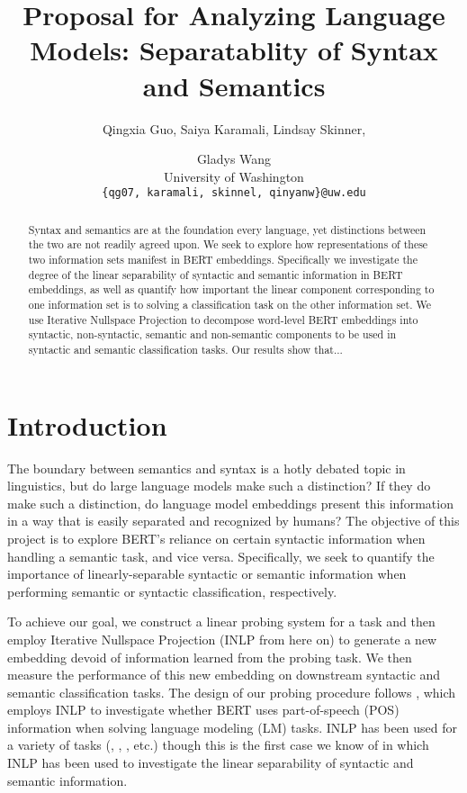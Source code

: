 \documentclass[11pt,a4paper]{article}
\title{Proposal for Analyzing Language Models: Separatablity of Syntax and Semantics}
\author{Qingxia Guo, Saiya Karamali, Lindsay Skinner, \and Gladys Wang
 \\ University of Washington \\ 
\texttt{\{qg07, karamali, skinnel, qinyanw\}@uw.edu}\\ 
}
\date{}
\begin{document}
\maketitle

\begin{abstract}
Syntax and semantics are at the foundation every language, yet distinctions between the two are not readily agreed upon. We seek to explore how representations of these two information sets manifest in BERT embeddings. Specifically we investigate the degree of the linear separability of syntactic and semantic information in BERT embeddings, as well as quantify how important the linear component corresponding to one information set is to solving a classification task on the other information set. We use Iterative Nullspace Projection to decompose word-level BERT embeddings into syntactic, non-syntactic, semantic and non-semantic components to be used in syntactic and semantic classification tasks. Our results show that...
\end{abstract}



\section{Introduction}
\label{sec:introduction}


The boundary between semantics and syntax is a hotly debated topic in linguistics, but do large language models make such a distinction? If they do make such a distinction, do language model embeddings present this information in a way that is easily separated and recognized by humans? The objective of this project is to explore BERT\rq s \citep{bert} reliance on certain syntactic information when handling a semantic task, and vice versa. Specifically, we seek to quantify the importance of linearly-separable syntactic or semantic information when performing semantic or syntactic classification, respectively. 

To achieve our goal, we construct a linear probing system for a task and then employ Iterative Nullspace Projection (INLP from here on) \citep{inlp} to generate a new embedding devoid of information learned from the probing task. We then measure the performance of this new embedding on downstream syntactic and semantic classification tasks. The design of our probing procedure follows \citep{amnesia}, which employs INLP to investigate whether BERT uses part-of-speech (POS) information when solving language modeling (LM) tasks. INLP has been used for a variety of tasks (\citep{inlp}, \citep{amnesia}, \citep{mbertGreek}, etc.) though this is the first case we know of in which INLP has been used to investigate the linear separability of syntactic and semantic information. 
\end{document}

